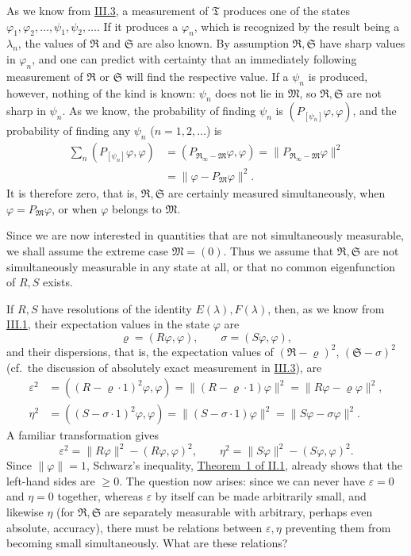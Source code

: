 \documentclass[fontsize=13pt,twoside,openany,headings=normal,parskip=false,bookmarkpackage=false,DIV=calc]{scrbook}
\begin{document}
As we know from \hyperref[sec:III.3]{III.3}, a measurement of $\mathfrak T$ produces one of the states $\varphi_1,\varphi_2,\ldots,\psi_1,\psi_2,\ldots$. If it produces a $\varphi_n$, which is recognized by the result being a $\lambda_n$, the values of $\mathfrak R$ and $\mathfrak S$ are also known. By assumption $\mathfrak R,\mathfrak S$ have sharp values in $\varphi_n$, and one can predict with certainty that an immediately following measurement of $\mathfrak R$ or $\mathfrak S$ will find the respective value. If a $\psi_n$ is produced, however, nothing of the kind is known: $\psi_n$ does not lie in $\mathfrak M$, so $\mathfrak R,\mathfrak S$ are not sharp in $\psi_n$. As we know, the probability of finding $\psi_n$ is $(P_{[\psi_n]}\varphi,\varphi)$, and the probability of finding any $\psi_n$ ($n=1,2,\ldots$) is
\begin{align*}
\sum_n(P_{[\psi_n]}\varphi,\varphi)
&=(P_{\mathfrak R_\infty-\mathfrak M}\varphi,\varphi)
=\|P_{\mathfrak R_\infty-\mathfrak M}\varphi\|^2\\
&=\|\varphi-P_{\mathfrak M}\varphi\|^2.
\end{align*}
It is therefore zero, that is, $\mathfrak R,\mathfrak S$ are certainly measured simultaneously, when $\varphi=P_{\mathfrak M}\varphi$, or when $\varphi$ belongs to $\mathfrak M$.

Since we are now interested in quantities that are not simultaneously measurable, we shall assume the extreme case $\mathfrak M=(0)$. Thus we assume that $\mathfrak R,\mathfrak S$ are not simultaneously measurable in any state at all, or that no common eigenfunction of $R,S$ exists.

If $R,S$ have resolutions of the identity $E(\lambda),F(\lambda)$, then, as we know from \hyperref[sec:III.1]{III.1}, their expectation values in the state $\varphi$ are
\[
\varrho=(R\varphi,\varphi),\qquad\sigma=(S\varphi,\varphi),
\]
and their dispersions, that is, the expectation values of $(\mathfrak R-\varrho)^2$, $(\mathfrak S-\sigma)^2$ (cf.\ the discussion of absolutely exact measurement in \hyperref[sec:III.3]{III.3}), are
\begin{align*}
\varepsilon^2&=((R-\varrho\cdot1)^2\varphi,\varphi)
=\|(R-\varrho\cdot1)\varphi\|^2=\|R\varphi-\varrho\varphi\|^2,\\
\eta^2&=((S-\sigma\cdot1)^2\varphi,\varphi)
=\|(S-\sigma\cdot1)\varphi\|^2=\|S\varphi-\sigma\varphi\|^2.
\end{align*}
A familiar transformation gives
\[
\varepsilon^2=\|R\varphi\|^2-(R\varphi,\varphi)^2,\qquad
\eta^2=\|S\varphi\|^2-(S\varphi,\varphi)^2.
\]
Since $\|\varphi\|=1$, Schwarz's inequality, \hyperref[thm:II.1]{Theorem~1 of II.1}, already shows that the left-hand sides are $\ge0$. The question now arises: since we can never have $\varepsilon=0$ and $\eta=0$ together, whereas $\varepsilon$ by itself can be made arbitrarily small,
\hypertarget{origpage-123}{}%
and likewise $\eta$ (for $\mathfrak R,\mathfrak S$ are separately measurable with arbitrary, perhaps even absolute, accuracy), there must be relations between $\varepsilon,\eta$ preventing them from becoming small simultaneously. What are these relations?
\end{document}

